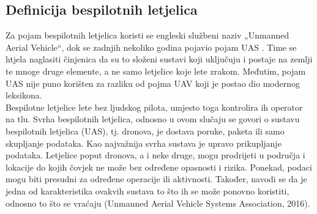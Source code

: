 \documentclass[times, utf8, diplomski]{fer}
\begin{document}
\subsection{Definicija bespilotnih letjelica}
Za pojam bespilotnih letjelica koristi se engleski službeni naziv „Unmanned Aerial Vehicle“,  dok  se  zadnjih  nekoliko  godina  pojavio  pojam  UAS  . Time se htjela naglasiti činjenica da su to složeni sustavi koji uključuju i postaje na zemlji te mnoge druge elemente, a ne samo letjelice koje lete zrakom. Međutim, pojam UAS nije puno korišten za razliku od pojma UAV koji je postao dio modernog leksikona.\\
Bespilotne letjelice lete bez ljudskog pilota, umjesto toga kontrolira ih operator na tlu. Svrha bespilotnih letjelica, odnosno u ovom slučaju se govori o sustavu bespilotnih letjelica (UAS),  tj.  dronova, je  dostava poruke,  paketa  ili  samo  skupljanje  podataka. Kao najvažnija svrha sustava je upravo prikupljanje podataka. Letjelice poput dronova, a i neke druge, mogu prodrijeti  u  područja  i  lokacije  do  kojih  čovjek  ne  može  bez  određene  opasnosti  i  rizika. Ponekad, podaci mogu biti presudni za određene operacije ili aktivnosti. Također, navodi se da je jedna od karakteristika ovakvih sustava to što ih se može ponovno koristiti, odnosno to što se vraćaju (Unmanned Aerial Vehicle Systems Association, 2016).
\end{document}
